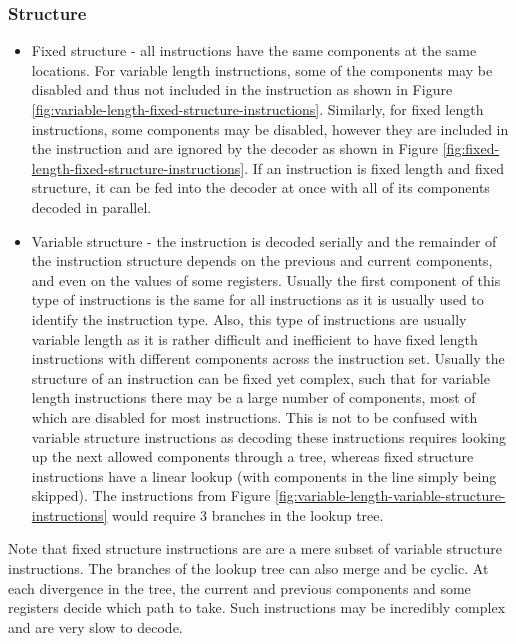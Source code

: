 \documentclass{report}
\begin{document}
\subsubsection{Structure}

\begin{itemize}
    \item{Fixed structure - all instructions have the same components at the
        same locations. For variable length instructions, some of the components
        may be disabled and thus not included in the instruction as shown in
        Figure \ref{fig:variable-length-fixed-structure-instructions}.
        Similarly, for fixed length instructions, some components may be
        disabled, however they are included in the instruction and are ignored
        by the decoder as shown in Figure
        \ref{fig:fixed-length-fixed-structure-instructions}. If an instruction
        is fixed length and fixed structure, it can be fed into the decoder at
        once with all of its components decoded in parallel.}
    \item{Variable structure - the instruction is decoded serially and the
        remainder of the instruction structure depends on the previous and
        current components, and even on the values of some registers. Usually
        the first component of this type of instructions is the same for all
        instructions as it is usually used to identify the instruction type.
        Also, this type of instructions are usually variable length as it is
        rather difficult and inefficient to have fixed length instructions with
        different components across the instruction set. Usually the structure
        of an instruction can be fixed yet complex, such that for variable
        length instructions there may be a large number of components, most of
        which are disabled for most instructions. This is not to be confused
        with variable structure instructions as decoding these instructions
        requires looking up the next allowed components through a tree, whereas
        fixed structure instructions have a linear lookup (with components in
        the line simply being skipped). The instructions from Figure
        \ref{fig:variable-length-variable-structure-instructions} would require
        3 branches in the lookup tree.}
\end{itemize}

Note that fixed structure instructions are are a mere subset of variable
structure instructions. The branches of the lookup tree can also merge and be
cyclic. At each divergence in the tree, the current and previous components and
some registers decide which path to take. Such instructions may be incredibly
complex and are very slow to decode.
\end{document}
